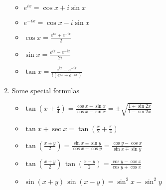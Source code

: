 \documentclass[12pt]{article}
\theoremstyle{definition}
\begin{document}
\begin{enumerate}
\begin{itemize}
\item $e^{ix}=\cos x+i\sin x$
\item $e^{-ix}=\cos x-i\sin x$
\item $\displaystyle \cos x=\frac{e^{ix}+e^{-ix}}{2}$
\item $\displaystyle \sin x=\frac{e^{ix}-e^{-ix}}{2i}$
\item $\displaystyle \tan x=\frac{e^{ix}-e^{-ix}}{i(e^{ix}+e^{-ix})}$
\end{itemize}

\item Some special formulas

\begin{itemize}
\item $\displaystyle\tan{\left(x\!+\!\frac{\pi}{4}\right)} = 
\frac{\cos{x}+\sin{x}}{\cos{x}-\sin{x}} = \pm\sqrt{\frac{1+\sin{2x}}{1-\sin{2x}}}$
\item $\displaystyle\tan x+\sec x = \tan\left(\frac{x}{2}+\frac{\pi}{4}\right)$
\item $\displaystyle\tan\left(\frac{x\pm y}{2}\right) = 
 \frac{\sin{x}\pm\sin{y}}{\cos{x}+\cos{y}} = \frac{\cos{y}-\cos{x}}{\sin{x}\mp\sin{y}}$
\item $\displaystyle\tan\left(\frac{x+y}{2}\right)\,\tan\left(\frac{x-y}{2}\right) =  
 \frac{\cos{y}-\cos{x}}{\cos{y}+\cos{x}}$
\item $\displaystyle\sin(x+y)\,\sin(x-y) = \sin^2x-\sin^2y$
\end{itemize}

\end{enumerate}
\end{document}
